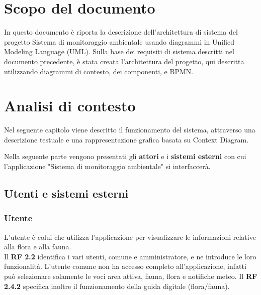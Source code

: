 \chapter*{Scopo del documento}

In questo documento è riporta la descrizione dell’architettura di sistema del progetto Sistema di monitoraggio ambientale usando diagrammi in Unified Modeling Language (UML).
Sulla base dei requisiti di sistema descritti nel documento precedente, è stata creata l'architettura del progetto, qui descritta utilizzando diagrammi di contesto, dei componenti, e BPMN. 

\chapter{Analisi di contesto}


Nel seguente capitolo viene descritto il funzionamento del sistema, attraverso una descrizione testuale e una rappresentazione grafica basata su Context Diagram.

\vspace{5mm} 
Nella seguente parte vengono presentati gli \textbf{attori} e i \textbf{sistemi esterni} con cui l'applicazione "Sistema di monitoraggio ambientale" si interfaccerà.

\section{Utenti e sistemi esterni}
\subsection{Utente}
L'utente è colui che utilizza l'applicazione per visualizzare le informazioni relative alla flora e alla fauna. \\
Il \textbf{RF 2.2} identifica i vari utenti, comune e amministratore, e ne introduce le loro funzionalità.  L'utente comune non ha accesso completo all'applicazione, infatti può selezionare solamente le voci area attiva, fauna, flora e notifiche meteo. Il \textbf{RF 2.4.2} specifica inoltre il funzionamento della guida digitale (flora/fauna). 

